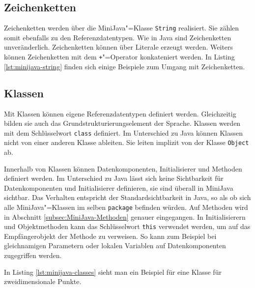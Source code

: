 

\subsection{Zeichenketten}
\label{subsec:MiniJava-Zeichenketten}

Zeichenketten werden über die MiniJava"=Klasse \lstinline{String} realisiert. Sie zählen somit ebenfalls zu den Referenzdatentypen. Wie in Java sind Zeichenketten unveränderlich. Zeichenketten können über Literale erzeugt werden. Weiters können Zeichenketten mit dem \lstinline{+}"=Operator konkateniert werden. In Listing \ref{lst:minijava-string} finden sich einige Beispiele zum Umgang mit Zeichenketten.



\subsection{Klassen}
\label{subsec:MiniJava-Klassen}

Mit Klassen können eigene Referenzdatentypen definiert werden. Gleichzeitig bilden sie auch das Grundstrukturierungselement der Sprache. Klassen werden mit dem Schlüsselwort \lstinline{class} definiert. Im Unterschied zu Java können Klassen nicht von einer anderen Klasse ableiten. Sie leiten implizit von der Klasse \lstinline{Object} ab.

Innerhalb von Klassen können Datenkomponenten, Initialisierer und Methoden definiert werden. Im Unterschied zu Java lässt sich keine Sichtbarkeit für Datenkomponenten und Initialisierer definieren, sie sind überall in MiniJava sichtbar. Das Verhalten entspricht der Standardsichtbarkeit in Java, so als ob sich alle MiniJava"=Klassen im selben \lstinline{package} befinden würden. Auf Methoden wird in Abschnitt \ref{subsec:MiniJava-Methoden} genauer eingegangen. In Initialisierern und Objektmethoden kann das Schlüsselwort \lstinline{this} verwendet werden, um auf das Empfängerobjekt der Methode zu verweisen. So kann zum Beispiel bei gleichnamigen Parametern oder lokalen Variablen auf Datenkomponenten zugegriffen werden.

In Listing \ref{lst:minijava-classes} sieht man ein Beispiel für eine Klasse für zweidimensionale Punkte.

